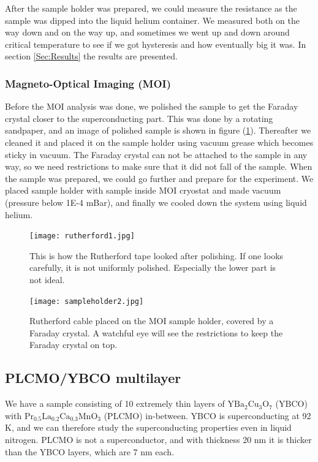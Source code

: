 \documentclass{comjnl}
\newcommand*\chem[1]{\ensuremath{\mathrm{#1}}}
\begin{document}
After the sample holder was prepared, we could measure the resistance as the sample was dipped into the liquid helium container. We measured both on the way down and on the way up, and sometimes we went up and down around critical temperature to see if we got hysteresis and how eventually big it was. In section \ref{Sec:Results} the results are presented.

\subsubsection{Magneto-Optical Imaging (MOI)}
Before the MOI analysis was done, we polished the sample to get the Faraday crystal closer to the superconducting part. This was done by a rotating sandpaper, and an image of polished sample is shown in figure (\ref{fig:rutherford1}). Thereafter we cleaned it and placed it on the sample holder using vacuum grease which becomes sticky in vacuum. The Faraday crystal can not be attached to the sample in any way, so we need restrictions to make sure that it did not fall of the sample. When the sample was prepared, we could go further and prepare for the experiment. We placed sample holder with sample inside MOI cryostat and made vacuum (pressure below 1E-4 mBar), and finally we cooled down the system using liquid helium.
\begin{figure}[h]
\centering
\texttt{[image: rutherford1.jpg]}
\caption{This is how the Rutherford tape looked after polishing. If one looks carefully, it is not uniformly polished. Especially the lower part is not ideal. \label{fig:rutherford1}}
\end{figure}
\begin{figure}[h]
\centering
\texttt{[image: sampleholder2.jpg]}
\caption{Rutherford cable placed on the MOI sample holder, covered by a Faraday crystal. A watchful eye will see the restrictions to keep the Faraday crystal on top. \label{fig:sampleholder2}}
\end{figure}

\subsection{PLCMO/YBCO multilayer}
We have a sample consisting of 10 extremely thin layers of \chem{YBa_2Cu_3O_7} (YBCO) with \chem{Pr_{0.5}La_{0.2}Ca_{0.3}MnO_3} (PLCMO) in-between. YBCO is superconducting at 92 K, and we can therefore study the superconducting properties even in liquid nitrogen. PLCMO is not a superconductor, and with thickness 20 nm it is thicker than the YBCO layers, which are 7 nm each. 
\end{document}

